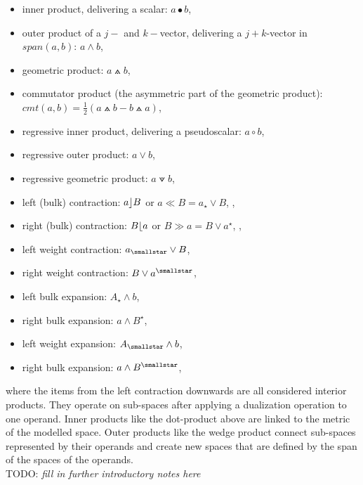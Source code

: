 \begin{itemize}
    \item inner product, delivering a scalar: $a \bullet b$, 
    \item outer product of a $j-$ and $k-$vector, delivering a $j+k$-vector in
    $span(a,b)$: $a \wedge b$, 
    \item geometric product:  $a \wedgedot b$, 
    \item commutator product (the asymmetric part of the geometric product): $cmt(a,b) =
    \frac{1}{2}(a \wedgedot b - b \wedgedot a)$,
    \item regressive inner product, delivering a pseudoscalar: $a \circ b$,
    \item regressive outer product: $a \vee b$, 
    \item regressive geometric product: $a \veedot b$, 
    
    \item left (bulk) contraction: $a \rfloor B$ or $a \ll B = a_{\star} \vee B $,
    ,   
    \item right (bulk) contraction: $B \lfloor a$ or $B \gg a = B \vee a^{\star} $,
    , 

    \item left weight contraction: $a_{\smallstar} \vee B $,
    \item right weight contraction: $B \vee a^{\smallstar} $,

    \item left bulk expansion: $A_{\star} \wedge b $,
    \item right bulk expansion: $a \wedge B^{\star} $,

    \item left weight expansion: $A_{\smallstar} \wedge b $,
    \item right bulk expansion: $a \wedge B^{\smallstar} $,
\end{itemize}
where the items from the left contraction downwards are all considered interior products.
They operate on sub-spaces after applying a dualization operation to one operand. Inner
products like the dot-product above are linked to the metric of the modelled space. Outer
products like the wedge product connect sub-spaces represented by their operands and
create new spaces that are defined by the span of the spaces of the operands. \\


TODO: \emph{fill in further introductory notes here} \\

\newpage
